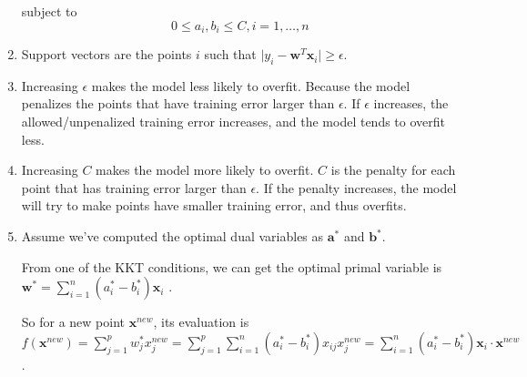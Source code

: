 \documentclass[paper=letter, fontsize=12pt]{article}
\begin{document}
\begin{enumerate}[label=(\alph*)]
	subject to 
	$$
	0 \leq a_i, b_i \leq C, i = 1, \dots, n
	$$
	
	\item
	Support vectors are the points $i$ such that $\vert y_i - \mathbf{w}^T \mathbf{x}_i \vert \geq \epsilon$.
	
	\item
	Increasing $\epsilon$ makes the model less likely to overfit. Because the model penalizes the points that have training error larger than $\epsilon$. If $\epsilon$ increases, the allowed/unpenalized training error increases, and the model tends to overfit less.
	
	\item
	Increasing $C$ makes the model more likely to overfit. $C$ is the penalty for each point that has training error larger than $\epsilon$. If the penalty increases, the model will try to make points have smaller training error, and thus overfits.
	
	\item    
	Assume we've computed the optimal dual variables as $\mathbf{a}^*$ and $\mathbf{b}^*$.
	
	From one of the KKT conditions, we can get the optimal primal variable is $\mathbf{w}^* = \sum_{i = 1}^{n} (a_i^* - b_i^*) \mathbf{x}_i$ .
	
	So for a new point $\mathbf{x}^{new}$, its evaluation is $f(\mathbf{x}^{new}) = \sum_{j = 1}^{p} w_j^* x_j^{new} = \sum_{j = 1}^{p} \sum_{i = 1}^{n} (a_i^* - b_i^*) x_{ij} x_j^{new} = \sum_{i = 1}^{n} (a_i^* - b_i^*) \mathbf{x}_i \cdot \mathbf{x}^{new }$.
\end{enumerate}
\end{document}
